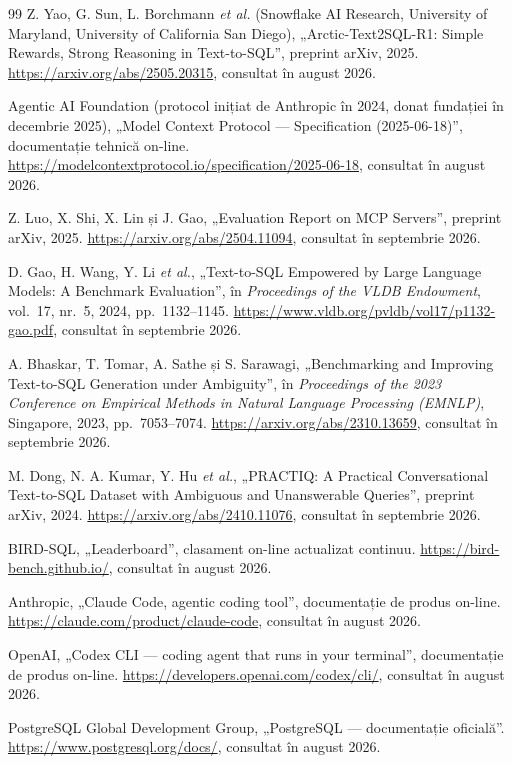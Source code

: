 \documentclass[12pt,a4paper]{report}
\begin{document}
\begin{thebibliography}{99}
Z. Yao, G. Sun, L. Borchmann \emph{et al.} (Snowflake AI Research,
University of Maryland, University of California San Diego),
„Arctic-Text2SQL-R1: Simple Rewards, Strong Reasoning in Text-to-SQL”,
preprint arXiv, 2025. \url{https://arxiv.org/abs/2505.20315}, consultat în
august 2026.

Agentic AI Foundation (protocol inițiat de Anthropic în 2024, donat
fundației în decembrie 2025), „Model Context Protocol --- Specification
(2025-06-18)”, documentație tehnică on-line.
\url{https://modelcontextprotocol.io/specification/2025-06-18}, consultat în
august 2026.

Z. Luo, X. Shi, X. Lin și J. Gao, „Evaluation Report on MCP Servers”,
preprint arXiv, 2025. \url{https://arxiv.org/abs/2504.11094}, consultat în
septembrie 2026.

D. Gao, H. Wang, Y. Li \emph{et al.}, „Text-to-SQL Empowered by Large Language
Models: A Benchmark Evaluation”, în \emph{Proceedings of the VLDB Endowment},
vol.\ 17, nr.\ 5, 2024, pp.\ 1132--1145.
\url{https://www.vldb.org/pvldb/vol17/p1132-gao.pdf}, consultat în septembrie
2026.

A. Bhaskar, T. Tomar, A. Sathe și S. Sarawagi, „Benchmarking and Improving
Text-to-SQL Generation under Ambiguity”, în \emph{Proceedings of the 2023
Conference on Empirical Methods in Natural Language Processing (EMNLP)},
Singapore, 2023, pp.\ 7053--7074.
\url{https://arxiv.org/abs/2310.13659}, consultat în septembrie 2026.

M. Dong, N. A. Kumar, Y. Hu \emph{et al.}, „PRACTIQ: A Practical
Conversational Text-to-SQL Dataset with Ambiguous and Unanswerable Queries”,
preprint arXiv, 2024. \url{https://arxiv.org/abs/2410.11076}, consultat în
septembrie 2026.

BIRD-SQL, „Leaderboard”, clasament on-line actualizat continuu.
\url{https://bird-bench.github.io/}, consultat în august 2026.

Anthropic, „Claude Code, agentic coding tool”, documentație de produs
on-line. \url{https://claude.com/product/claude-code}, consultat în august
2026.

OpenAI, „Codex CLI --- coding agent that runs in your terminal”,
documentație de produs on-line.
\url{https://developers.openai.com/codex/cli/}, consultat în august 2026.

PostgreSQL Global Development Group, „PostgreSQL --- documentație oficială”.
\url{https://www.postgresql.org/docs/}, consultat în august 2026.


\end{thebibliography}
\end{document}
